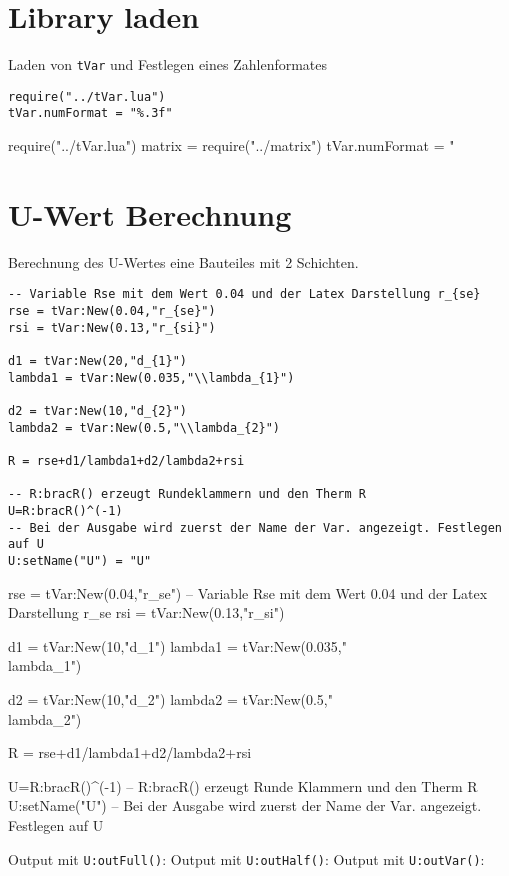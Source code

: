 


\section{Library laden}
Laden von \lstinline$tVar$ und Festlegen eines Zahlenformates
\begin{lstlisting}
require("../tVar.lua")
tVar.numFormat = "%.3f"
\end{lstlisting}
\begin{luacode*}
	require("../tVar.lua")
	matrix = require("../matrix")
	tVar.numFormat = "%
\end{luacode*}
\section{U-Wert Berechnung}
Berechnung des U-Wertes eine Bauteiles mit 2 Schichten.
\begin{lstlisting}
-- Variable Rse mit dem Wert 0.04 und der Latex Darstellung r_{se}
rse = tVar:New(0.04,"r_{se}")
rsi = tVar:New(0.13,"r_{si}") 
	
d1 = tVar:New(20,"d_{1}")
lambda1 = tVar:New(0.035,"\\lambda_{1}")
	
d2 = tVar:New(10,"d_{2}")
lambda2 = tVar:New(0.5,"\\lambda_{2}")
	
R = rse+d1/lambda1+d2/lambda2+rsi

-- R:bracR() erzeugt Rundeklammern und den Therm R
U=R:bracR()^(-1) 
-- Bei der Ausgabe wird zuerst der Name der Var. angezeigt. Festlegen auf U
U:setName("U") = "U"
\end{lstlisting}
\begin{luacode*}
	rse = tVar:New(0.04,"r_{se}") -- Variable Rse mit dem Wert 0.04 und der Latex Darstellung r_{se}
	rsi = tVar:New(0.13,"r_{si}") 
	
	d1 = tVar:New(10,"d_{1}")
	lambda1 = tVar:New(0.035,"\\lambda_{1}")
	
	d2 = tVar:New(10,"d_{2}")
	lambda2 = tVar:New(0.5,"\\lambda_{2}")
	
	R = rse+d1/lambda1+d2/lambda2+rsi
	
	U=R:bracR()^(-1) -- R:bracR() erzeugt Runde Klammern und den Therm R
	U:setName("U") -- Bei der Ausgabe wird zuerst der Name der Var. angezeigt. Festlegen auf U
\end{luacode*}
Output mit \lstinline{U:outFull()}:
Output mit \lstinline{U:outHalf()}:
Output mit \lstinline{U:outVar()}:
